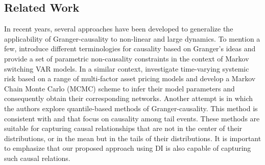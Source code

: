 
\subsection{Related Work}
In recent years, several approaches have been developed to generalize the applicability of Granger-causality to non-linear and large dynamics. 
To mention a few, \citet{psaradakis2005markov} introduce different terminologies for causality based on Granger’s ideas and provide a set of parametric non-causality constraints in the context of Markov switching VAR models.
In a similar context, \citet{bianchi2019modeling} investigate time-varying systemic risk based on a range of multi-factor asset pricing models and develop a Markov Chain Monte Carlo (MCMC) scheme to infer their model parameters and consequently obtain their corresponding networks.
Another attempt is \citet{bonaccolto2019estimation} in which the authors explore quantile-based methods of Granger-causality.
This method is consistent with \citet{hong2009granger} and \citet{corsi2018measuring} that focus on causality among tail events. 
These methods are suitable for capturing causal relationships that are not in the center of their distributions, or in the mean but in the tails of their distributions.
It is important to emphasize that our proposed approach using DI is also capable of capturing such causal relations. 

